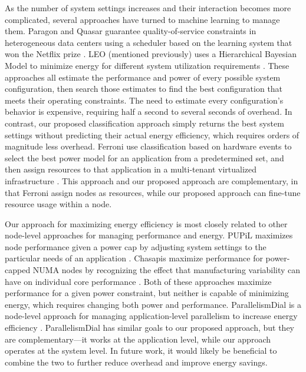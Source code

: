 As the number of system settings increases and their interaction becomes more complicated, several approaches have turned to machine learning to manage them.
Paragon \cite{Paragon} and Quasar \cite{quasar} guarantee quality-of-service constraints in heterogeneous data centers using a scheduler based on the learning system that won the Netflix prize \cite{NetflixPrize}.
LEO (mentioned previously) uses a Hierarchical Bayesian Model to minimize energy for different system utilization requirements \cite{LEO}.
These approaches all estimate the performance and power of every possible system configuration, then search those estimates to find the best configuration that meets their operating constraints.
The need to estimate every configuration's behavior is expensive, requiring half a second \cite{LEO} to several seconds \cite{Paragon} of overhead.
In contrast, our proposed classification approach simply returns the best system settings without predicting their actual energy efficiency, which requires orders of magnitude less overhead.
Ferroni \etal use classification based on hardware events to select the best power model for an application from a predetermined set, and then assign resources to that application in a multi-tenant virtualized infrastructure \cite{FerroniTACO}.
This approach and our proposed approach are complementary, in that Ferroni \etal assign nodes as resources, while our proposed approach can fine-tune resource usage within a node.

Our approach for maximizing energy efficiency is most closely related to other node-level approaches for managing performance and energy.
PUPiL maximizes node performance given a power cap by adjusting system settings to the particular needs of an application \cite{pupil}.
Chasapis \etal maximize performance for power-capped NUMA nodes by recognizing the effect that manufacturing variability can have on individual core performance \cite{Chasapis2016}.
Both of these approaches maximize performance for a given power constraint, but neither is capable of minimizing energy, which requires changing both power and performance.
ParallelismDial is a node-level approach for managing application-level parallelism to increase energy efficiency \cite{Sridharan2013}.
ParallelismDial has similar goals to our proposed approach, but they are complementary---it works at the application level, while our approach operates at the system level.
In future work, it would likely be beneficial to combine the two to further reduce overhead and improve energy savings.


